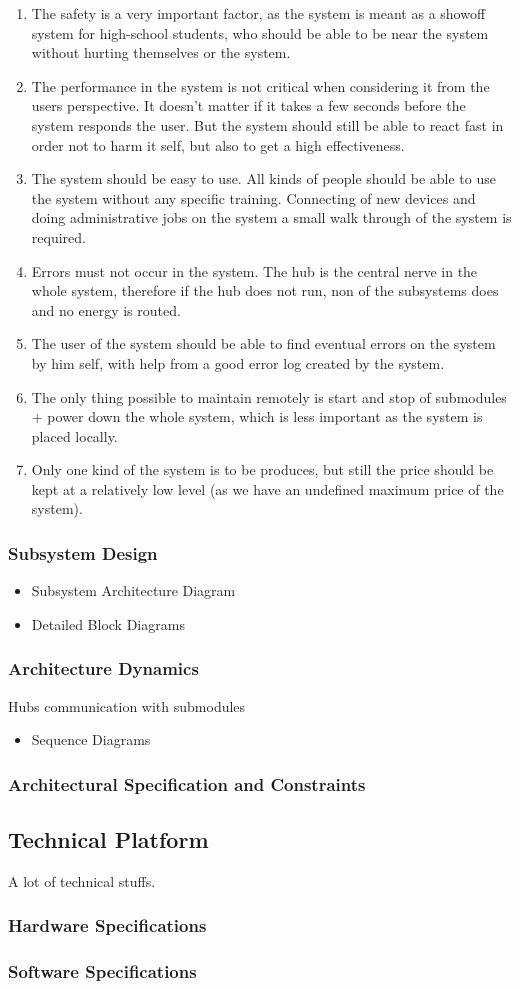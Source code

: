 			\begin{enumerate}
			\item The safety is a very important factor, as the system is meant as a showoff system for high-school students, who should
			be able to be near the system without hurting themselves or the system.
			\item The performance in the system is not critical when considering it from the users perspective. It doesn't matter if it takes a few seconds before the system responds the user.
			But the system should still be able to react fast in order not to harm it self, but also to get a high effectiveness. 
			\item The system should be easy to use. All kinds of people should be able to use the system without any specific training.
			Connecting of new devices and doing administrative jobs on the system a small walk through of the system is required. 
			\item Errors must not occur in the system. The hub is the central nerve in the whole system, therefore if the hub does not run, non of the subsystems does and no energy is routed.
			\item The user of the system should be able to find eventual errors on the system by him self, with help from a good error log created by the system.
			\item The only thing possible to maintain remotely is start and stop of submodules + power down the whole system, which is less important as the system is placed locally.
			\item Only one kind of the system is to be produces, but still the price should be kept at a relatively low level (as we have an undefined maximum price of the system).
			\end{enumerate}
				
	\subsubsection{Subsystem Design}
		\begin{itemize}
			\item Subsystem Architecture Diagram
			\item Detailed Block Diagrams
		\end{itemize}
	\subsubsection{Architecture Dynamics}
		Hubs communication with submodules
		\begin{itemize}
			\item Sequence Diagrams
		\end{itemize}
	\subsubsection{Architectural Specification and Constraints}
\subsection{Technical Platform}
	A lot of technical stuffs. 
	\subsubsection{Hardware Specifications}
	\subsubsection{Software Specifications}